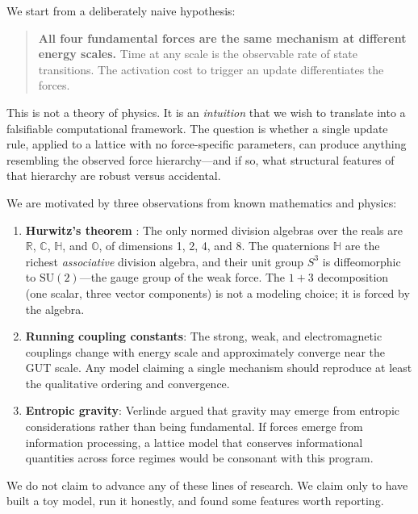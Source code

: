 \documentclass[letterpaper,12pt]{article}
\begin{document}
We start from a deliberately naive hypothesis:

\begin{quote}
\textbf{All four fundamental forces are the same mechanism at different energy scales.} Time at any scale is the observable rate of state transitions. The activation cost to trigger an update differentiates the forces.
\end{quote}

This is not a theory of physics. It is an \emph{intuition} that we wish to translate into a falsifiable computational framework. The question is whether a single update rule, applied to a lattice with no force-specific parameters, can produce anything resembling the observed force hierarchy---and if so, what structural features of that hierarchy are robust versus accidental.

We are motivated by three observations from known mathematics and physics:

\begin{enumerate}
  \item \textbf{Hurwitz's theorem} \cite{Hurwitz1898}: The only normed division algebras over the reals are $\mathbb{R}$, $\mathbb{C}$, $\mathbb{H}$, and $\mathbb{O}$, of dimensions 1, 2, 4, and 8. The quaternions $\mathbb{H}$ are the richest \emph{associative} division algebra, and their unit group $S^3$ is diffeomorphic to $\mathrm{SU}(2)$---the gauge group of the weak force. The $1+3$ decomposition (one scalar, three vector components) is not a modeling choice; it is forced by the algebra.

  \item \textbf{Running coupling constants}: The strong, weak, and electromagnetic couplings change with energy scale and approximately converge near the GUT scale. Any model claiming a single mechanism should reproduce at least the qualitative ordering and convergence.

  \item \textbf{Entropic gravity}: Verlinde \cite{Verlinde2011} argued that gravity may emerge from entropic considerations rather than being fundamental. If forces emerge from information processing, a lattice model that conserves informational quantities across force regimes would be consonant with this program.
\end{enumerate}

We do not claim to advance any of these lines of research. We claim only to have built a toy model, run it honestly, and found some features worth reporting.
\end{document}
